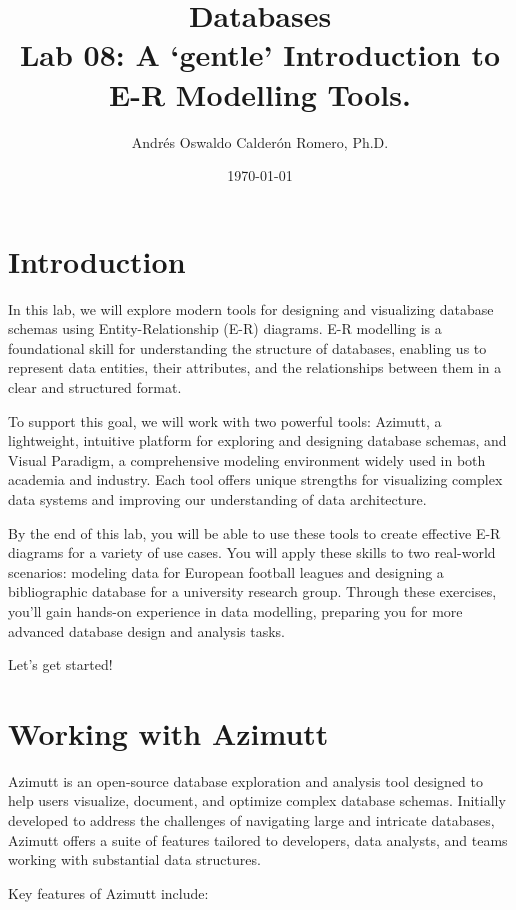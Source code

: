 \documentclass{article}
\title{Databases \\ Lab 08: A `gentle' Introduction to E-R Modelling Tools.}
\author{Andrés Oswaldo Calderón Romero, Ph.D.}
\date{\today}
\begin{document}
\maketitle

\section{Introduction}
In this lab, we will explore modern tools for designing and visualizing database schemas using Entity-Relationship (E-R) diagrams. E-R modelling is a foundational skill for understanding the structure of databases, enabling us to represent data entities, their attributes, and the relationships between them in a clear and structured format.

To support this goal, we will work with two powerful tools: Azimutt, a lightweight, intuitive platform for exploring and designing database schemas, and Visual Paradigm, a comprehensive modeling environment widely used in both academia and industry. Each tool offers unique strengths for visualizing complex data systems and improving our understanding of data architecture.

By the end of this lab, you will be able to use these tools to create effective E-R diagrams for a variety of use cases. You will apply these skills to two real-world scenarios: modeling data for European football leagues and designing a bibliographic database for a university research group. Through these exercises, you'll gain hands-on experience in data modelling, preparing you for more advanced database design and analysis tasks.

Let’s get started!

\section{Working with Azimutt} \label{sec:azimutt}
Azimutt is an open-source database exploration and analysis tool designed to help users visualize, document, and optimize complex database schemas. Initially developed to address the challenges of navigating large and intricate databases, Azimutt offers a suite of features tailored to developers, data analysts, and teams working with substantial data structures.

Key features of Azimutt include:
\end{document}
